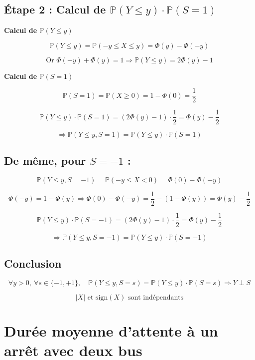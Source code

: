 \subsection*{Étape 2 : Calcul de \( \mathbb{P}(Y \leq y)\cdot \mathbb{P}(S = 1) \)}



\textbf{Calcul de \( \mathbb{P}(Y \leq y) \)}

\[
\mathbb{P}(Y \leq y) = \mathbb{P}(-y \leq X \leq y) = \Phi(y) - \Phi(-y)
\]

\[
\text{Or } \Phi(-y) + \Phi(y) = 1 \Rightarrow \mathbb{P}(Y \leq y) = 2\Phi(y) - 1
\]

\textbf{Calcul de \( \mathbb{P}(S = 1)\)}


\[
\mathbb{P}(S = 1) = \mathbb{P}(X \geq 0) = 1 - \Phi(0) = \frac{1}{2}
\]

\[
\mathbb{P}(Y \leq y)\cdot \mathbb{P}(S = 1) = \left(2\Phi(y) - 1\right)\cdot \frac{1}{2} = \Phi(y) - \frac{1}{2}
\]

\[
\Rightarrow \mathbb{P}(Y \leq y, S = 1) = \mathbb{P}(Y \leq y)\cdot \mathbb{P}(S = 1)
\]

\subsection*{De même, pour \( S = -1 \) :}

\[
\mathbb{P}(Y \leq y, S = -1) = \mathbb{P}(-y \leq X < 0) = \Phi(0) - \Phi(-y)
\]

\[
\Phi(-y) = 1 - \Phi(y) \Rightarrow \Phi(0) - \Phi(-y) = \frac{1}{2} - (1 - \Phi(y)) = \Phi(y) - \frac{1}{2}
\]

\[
\mathbb{P}(Y \leq y)\cdot \mathbb{P}(S = -1) = (2\Phi(y) - 1)\cdot \frac{1}{2} = \Phi(y) - \frac{1}{2}
\]

\[
\Rightarrow \mathbb{P}(Y \leq y, S = -1) = \mathbb{P}(Y \leq y)\cdot \mathbb{P}(S = -1)
\]

\subsection*{Conclusion}

\[
\forall y > 0,\ \forall s \in \{-1, +1\},\quad \mathbb{P}(Y \leq y, S = s) = \mathbb{P}(Y \leq y)\cdot \mathbb{P}(S = s)
\Rightarrow Y \perp S
\]

\[
\boxed{ |X| \text{ et } \mathrm{sign}(X) \text{ sont indépendants} }
\]


\section{Durée moyenne d’attente à un arrêt avec deux bus}

